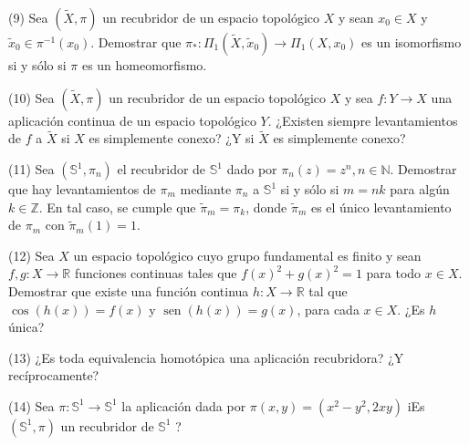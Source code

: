 \documentclass[
  a4paper,
  spanish,
  12pt,
]{scrartcl}
\begin{document}
\begin{ejer}
(9) Sea $(\widetilde{X}, \pi)$ un recubridor de un espacio topológico $X$ y sean $x_{0} \in X$ y $\widetilde{x}_{0} \in \pi^{-1}\left(x_{0}\right)$. Demostrar que $\pi_{*}: \Pi_{1}\left(\widetilde{X}, \widetilde{x}_{0}\right) \rightarrow \Pi_{1}\left(X, x_{0}\right)$ es un isomorfismo si y sólo si $\pi$ es un homeomorfismo.\\
\end{ejer}

\begin{ejer}
(10) Sea $(\widetilde{X}, \pi)$ un recubridor de un espacio topológico $X$ y sea $f: Y \rightarrow X$ una aplicación continua de un espacio topológico $Y$. ¿Existen siempre levantamientos de $f$ a $\widetilde{X}$ si $X$ es simplemente conexo? ¿Y si $\widetilde{X}$ es simplemente conexo?\\
\end{ejer}

\begin{ejer}
(11) Sea $\left(\mathbb{S}^{1}, \pi_{n}\right)$ el recubridor de $\mathbb{S}^{1}$ dado por $\pi_{n}(z)=z^{n}, n \in \mathbb{N}$. Demostrar que hay levantamientos de $\pi_{m}$ mediante $\pi_{n}$ a $\mathbb{S}^{1}$ si y sólo si $m=n k$ para algún $k \in \mathbb{Z}$. En tal caso, se cumple que $\widetilde{\pi}_{m}=\pi_{k}$, donde $\widetilde{\pi}_{m}$ es el único levantamiento de $\pi_{m}$ con $\widetilde{\pi}_{m}(1)=1$.\\
\end{ejer}

\begin{ejer}
(12) Sea $X$ un espacio topológico cuyo grupo fundamental es finito y sean $f, g: X \rightarrow \mathbb{R}$ funciones continuas tales que $f(x)^{2}+g(x)^{2}=1$ para todo $x \in X$. Demostrar que existe una función continua $h: X \rightarrow \mathbb{R}$ tal que $\cos (h(x))=f(x)$ y $\operatorname{sen}(h(x))=g(x)$, para cada $x \in X$. ¿Es $h$ única?\\
\end{ejer}

\begin{ejer}
(13) ¿Es toda equivalencia homotópica una aplicación recubridora? ¿Y recíprocamente?\\
\end{ejer}

\begin{ejer}
(14) Sea $\pi: \mathbb{S}^{1} \rightarrow \mathbb{S}^{1}$ la aplicación dada por $\pi(x, y)=\left(x^{2}-y^{2}, 2 x y\right)$ iEs $\left(\mathbb{S}^{1}, \pi\right)$ un recubridor de $\mathbb{S}^{1}$ ?\\
\end{ejer}
\end{document}
